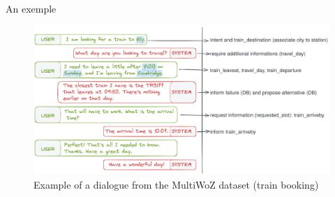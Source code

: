 \documentclass[10pt,aspectratio=169]{beamer}
\begin{document}
\begin{frame}{An exemple}
\begin{figure}
    \centering
    \includegraphics[width=1.\textwidth]{media/dialogue_task_train.png}
    \caption{Example of a dialogue from the MultiWoZ dataset (train booking)}
    \label{fig:example_train_dial_task}
\end{figure}
\end{frame}
\end{document}
